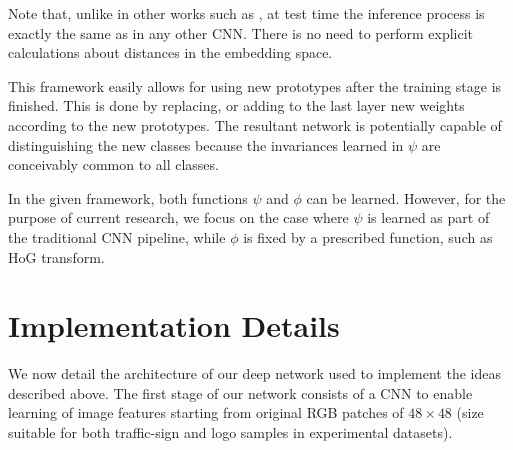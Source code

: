 \documentclass{bmvc2k}
\begin{document}
Note that, unlike in other works such as \cite{pala_geoff2009zsl,norouzi2013zero}, at test
time the inference process is exactly the same as in any other CNN. There is no need to 
perform explicit calculations about distances in the embedding space.

This framework easily allows for using new prototypes after
the training stage is finished. This is done by replacing, or adding to the last
layer new weights according to the new prototypes. The resultant network is
potentially capable of distinguishing the new classes because the invariances
learned in $\psi$ are conceivably common to all classes.


In the given framework, both functions $\psi$ and $\phi$ can be learned.
However, for the purpose of current research, we focus on the
case where $\psi$ is learned as part of the traditional CNN pipeline, while $\phi$ is fixed by 
a prescribed function, such as HoG transform.


\section{\label{sec:Implementation-Details}Implementation Details}
We now detail the architecture of our deep network used to implement the ideas described above. 
The first stage of our network consists of a CNN to enable learning of image features starting from 
original RGB patches of $48\times48$ (size suitable for both traffic-sign and
logo samples in experimental datasets). 
\end{document}
